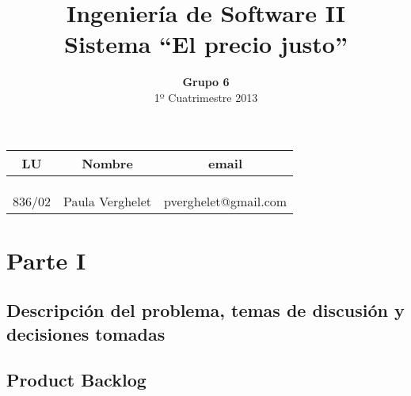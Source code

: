 \documentclass[a4paper,8pt]{article}
\title{Ingeniería de Software II\\ \textbf{Sistema ``El precio justo''}}
\author{\textbf{Grupo 6}\\ 1º Cuatrimestre 2013}
\date{}
\begin{document}
\maketitle
\vspace{10cm}
\begin{center}

\begin{tabular}{|c|c|c|}
\hline
\hline
\textbf{LU}&\textbf{Nombre}&\textbf{email}\\
\hline
& &\\
\hline
&&\\
\hline
&&\\
\hline
836/02&Paula Verghelet&pverghelet@gmail.com\\
\hline
\hline
\end{tabular}
\end{center}
\newpage

\section{Parte I}
\subsection{Descripción del problema, temas de discusión y decisiones tomadas}
\newpage
\subsection{Product Backlog}
\end{document}
